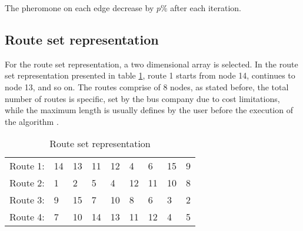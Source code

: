The pheromone on each edge decrease by $p\%$ after each iteration. 


\subsection{Route set representation}
For the route set representation, a two dimensional array is selected. In the route set representation presented in table \ref{table:routeSetRepr}, route 1 starts from node 14, continues to node 13, and so on. The routes comprise of 8 nodes, as stated before, the total number of routes is specific, set by the bus company due to cost limitations, while the maximum length is usually defines by the user before the execution of the algorithm \citep{kechagiopoulos14}.
\begin{table}[H]
    \begin{center}
        \begin{tabular}{|l| l l l l l l l l|}
      \hline
        Route 1: & 14 & 13 & 11 & 12 & 4 & 6 & 15 & 9 \\
        Route 2: & 1 & 2 & 5 & 4 & 12 & 11 & 10 & 8 \\
        Route 3: & 9 & 15 & 7 & 10 & 8 & 6 & 3 & 2 \\
        Route 4: & 7 & 10 & 14 & 13 & 11 & 12 & 4 & 5 \\
      \hline
        \end{tabular}
    \end{center}
    \caption {Route set representation}
    \label{table:routeSetRepr}
\end{table}


